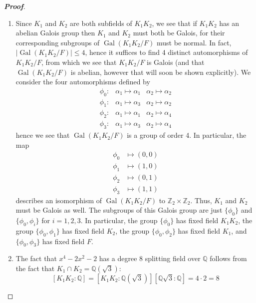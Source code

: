 \documentclass[12pt,leqno]{article}
\theoremstyle{definition}
\newcommand{\Gal}{\operatorname{Gal}}
\newcommand{\Z}{\mathbb{Z}}
\newcommand{\Q}{\mathbb{Q}}
\newenvironment{Proof}{\begin{proof}[\textnormal{\textbf{Proof}}]}{\end{proof}}
\begin{document}
\begin{enumerate}
\begin{Proof}
\begin{enumerate}
      \item Since $K_1$ and $K_2$ are both subfields of $K_1K_2$, we see that if $K_1K_2$ has an abelian Galois group then $K_1$ and $K_2$ must both be Galois, for their corresponding subgroups of $\Gal(K_1K_2/F)$ must be normal. In fact, \\$|\Gal(K_1K_2/F)|\leq4$, hence it suffices to find 4 distinct automorphisms of $K_1K_2/F$, from which we see that $K_1K_2/F$ is Galois (and that $\Gal(K_1K_2/F)$ is abelian, however that will soon be shown explicitly). We consider the four automorphisms defined by \begin{align*}\phi_0:&\alpha_1\mapsto\alpha_1 &\alpha_2\mapsto\alpha_2\\\phi_1:&\alpha_1\mapsto\alpha_3 &\alpha_2\mapsto\alpha_2\\\phi_2:&\alpha_1\mapsto\alpha_1 &\alpha_2\mapsto\alpha_4\\\phi_3:&\alpha_1\mapsto\alpha_3 &\alpha_2\mapsto\alpha_4\end{align*} hence we see that $\Gal(K_1K_2/F)$ is a group of order 4. In particular, the map \begin{align*}\phi_0&\mapsto(0,0)\\\phi_1&\mapsto(1,0)\\\phi_2&\mapsto(0,1)\\\phi_3&\mapsto(1,1)\end{align*} describes an isomorphism of $\Gal(K_1K_2/F)$ to $\Z_2\times\Z_2$. Thus, $K_1$ and $K_2$ must be Galois as well. The subgroups of this Galois group are just $\{\phi_0\}$ and $\{\phi_0,\phi_i\}$ for $i=1,2,3$. In particular, the group $\{\phi_0\}$ has fixed field $K_1K_2$, the group $\{\phi_0,\phi_1\}$ has fixed field $K_2$, the group $\{\phi_0,\phi_2\}$ has fixed field $K_1$, and $\{\phi_0,\phi_3\}$ has fixed field $F$.
      \item The fact that $x^4-2x^2-2$ has a degree 8 splitting field over $\Q$ follows from the fact that $K_1\cap K_2=\Q(\sqrt{3})$: \[[K_1K_2:\Q]=[K_1K_2:\Q(\sqrt{3})][\Q\sqrt{3}:\Q]=4\cdot2=8\]
  \end{enumerate}
    \end{Proof}
  \end{enumerate}
\end{document}
